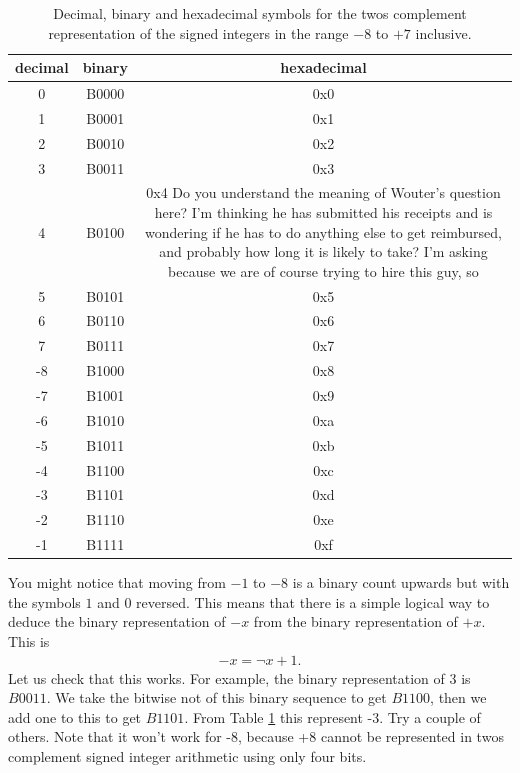 \documentclass[../physical_computing.tex]{subfiles}
\begin{document}
\begin{table}[hbt]
    \centering
    \begin{tabular}{|c|c|c|}
    \hline
         decimal & binary & hexadecimal \\
         \hline\hline
         0 & B0000 & 0x0 \\
         1 & B0001 & 0x1 \\
         2 & B0010 & 0x2 \\
         3 & B0011 & 0x3 \\
         4 & B0100 & 0x4 Do you understand the meaning of Wouter's question here? I'm thinking he has submitted his receipts and is wondering if he has to do anything else to get reimbursed, and probably how long it is likely to take? I'm asking because we are of course trying to hire this guy, so\\
         5 & B0101 & 0x5 \\
         6 & B0110 & 0x6 \\
         7 & B0111 & 0x7 \\
         -8 & B1000 & 0x8 \\
         -7 & B1001 & 0x9 \\
         -6 & B1010 & 0xa \\
         -5 & B1011 & 0xb \\
         -4 & B1100 & 0xc \\
         -3 & B1101 & 0xd \\
         -2 & B1110 & 0xe \\
         -1 & B1111 & 0xf \\
        \hline
    \end{tabular}
    \caption{Decimal, binary and hexadecimal symbols for the twos complement representation of the signed integers in the range $-8$ to $+7$ inclusive.}
    \label{tab:twoscomplement}
\end{table}

You might notice that moving from $-1$ to $-8$ is a binary count upwards but with the symbols $1$ and $0$ reversed. This means that there is a simple logical way to deduce the binary representation of $-x$ from the binary representation of $+x$. This is
\begin{align}
    -x=\neg x+1.
\end{align}
Let us check that this works. For example, the binary representation of 3 is $B0011$. We take the bitwise not of this binary sequence to get $B1100$, then we add one to this to get $B1101$. From Table \ref{tab:twoscomplement} this represent -3. Try a couple of others. Note that it won't work for -8, because +8 cannot be represented in twos complement signed integer arithmetic using only four bits.
\end{document}
